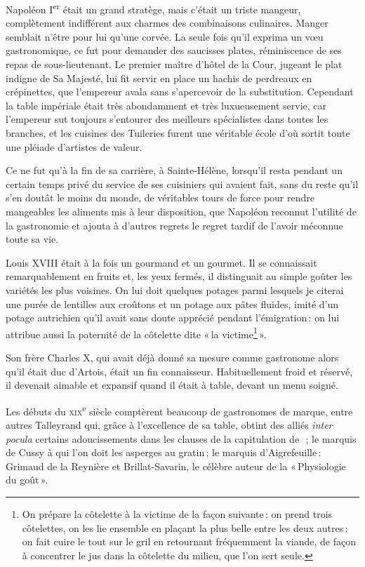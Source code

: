 Napoléon I\textsuperscript{er} était un grand stratège, mais c'était un triste
mangeur, complètement indifférent aux charmes des combinaisons culinaires.
Manger semblait n'être pour lui qu'une corvée. La seule fois qu'il exprima un
vœu gastronomique, ce fut pour demander des saucisses plates, réminiscence de
ses repas de sous-lieutenant. Le premier maître d'hôtel de la Cour, jugeant le
plat indigne de Sa Majesté, lui fit servir en place un hachis de perdreaux en
crépinettes, que l'empereur avala sans s'apercevoir de la substitution.
Cependant la table impériale était très abondamment et très luxueusement
servie, car l'empereur sut toujours s'entourer des meilleurs spécialistes dans
toutes les branches, et les cuisines des Tuileries furent une véritable école
d'où sortit toute une pléiade d'artistes de valeur.

Ce ne fut qu'à la fin de sa carrière, à Sainte-Hélène, lorsqu'il resta pendant
un certain temps privé du service de ses cuisiniers qui avaient fait, sans du
reste qu'il s'en doutât le moins du monde, de véritables tours de force pour
rendre mangeables les aliments mis à leur disposition, que Napoléon reconnut
l'utilité de la gastronomie et ajouta à d'autres regrets le regret tardif de
l'avoir méconnue toute sa vie.

Louis XVIII était à la fois un gourmand et un gourmet. Il se connaissait
remarquablement en fruits et, les yeux fermés, il distinguait au simple goûter
les variétés les plus voisines. On lui doit quelques potages parmi lesquels je
citerai une purée de lentilles aux croûtons et un potage aux pâtes fluides,
imité d’un potage autrichien qu'il avait sans doute apprécié pendant
l'émigration : on lui attribue aussi la paternité de la côtelette dite « la
victime\footnote{On prépare la côtelette à la victime de la façon suivante : on
prend trois côtelettes, on les lie ensemble en plaçant la plus belle entre les
deux autres : on fait cuire le tout sur le gril en retournant fréquemment la
viande, de façon à concentrer le jus dans la côtelette du milieu, que l'on sert
seule.} ».

Son frère Charles X, qui avait déjà donné sa mesure comme gastronome alors
qu'il était duc d'Artois, était un fin connaisseur. Habituellement froid et
réservé, il devenait aimable et expansif quand il était à table, devant un menu
soigné.

Les débuts du \textsc{xix}\textsuperscript{e} siècle comptèrent beaucoup de
gastronomes de marque, entre autres Talleyrand qui, grâce à l'excellence de sa
table, obtint des alliés \textit{inter pocula} certains adoucissements dans les
clauses de la capitulation de {\mmm} {\mmm} ; le marquis de Cussy
à qui l’on doit les asperges au gratin ; le marquis d'Aigrefeuille : Grimaud de
la Reynière et Brillat-Savarin, le célèbre auteur de la « Physiologie du
goût ».

